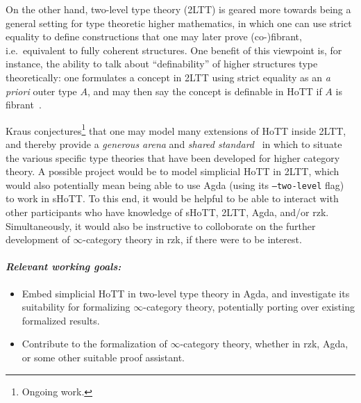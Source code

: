 \documentclass[a4paper]{article}
\begin{document}
On the other hand, two-level type theory (2LTT) is geared more towards being a general setting for type theoretic higher mathematics, in which one can use strict equality to define constructions that one may later prove (co-)fibrant, i.e.\ equivalent to fully coherent structures.
One benefit of this viewpoint is, for instance, the ability to talk about ``definability'' of higher structures type theoretically: one formulates a concept in 2LTT using strict equality as an \emph{a priori} outer type $A$, and may then say the concept is definable in HoTT if $A$ is fibrant~\cite{cite}.

Kraus conjectures\footnote{Ongoing work.} that one may model many extensions of HoTT inside 2LTT, and thereby provide a \emph{generous arena} and \emph{shared standard}~\cite{maddy:19:what-do-we-want} in which to situate the various specific type theories that have been developed for higher category theory.
A possible project would be to model simplicial HoTT in 2LTT, which would also potentially mean being able to use Agda (using its \texttt{--two-level} flag) to work in sHoTT.
To this end, it would be helpful to be able to interact with other participants who have knowledge of sHoTT, 2LTT, Agda, and/or rzk.
Simultaneously, it would also be instructive to colloborate on the further development of $\infty$-category theory in rzk, if there were to be interest.

\paragraph{\normalfont \emph{Relevant working goals:}}
\begin{itemize}
    \item Embed simplicial HoTT in two-level type theory in Agda, and investigate its suitability for formalizing $\infty$-category theory, potentially porting over existing formalized results.
    \item Contribute to the formalization of $\infty$-category theory, whether in rzk, Agda, or some other suitable proof assistant.
\end{itemize}



\printbibliography[heading=subbibliography]
\end{document}
